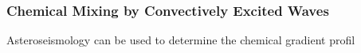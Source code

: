 {\color{purple}
\subsubsection{Chemical Mixing by Convectively Excited Waves}
}

Asteroseismology can be used to determine the chemical gradient profil

